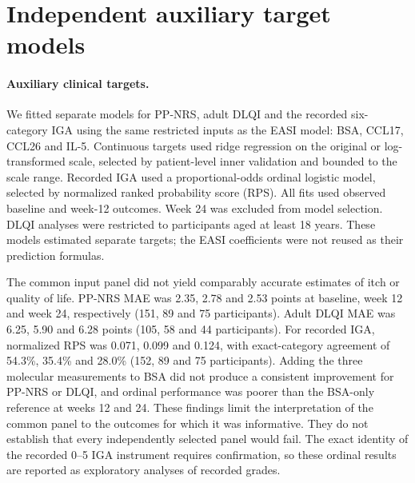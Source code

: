 \section*{Independent auxiliary target models}
\paragraph{Auxiliary clinical targets.}
We fitted separate models for PP-NRS, adult DLQI and the recorded six-category IGA using the same restricted inputs as the EASI model: BSA, CCL17, CCL26 and IL-5. Continuous targets used ridge regression on the original or log-transformed scale, selected by patient-level inner validation and bounded to the scale range. Recorded IGA used a proportional-odds ordinal logistic model, selected by normalized ranked probability score (RPS). All fits used observed baseline and week-12 outcomes. Week 24 was excluded from model selection. DLQI analyses were restricted to participants aged at least 18 years. These models estimated separate targets; the EASI coefficients were not reused as their prediction formulas.

The common input panel did not yield comparably accurate estimates of itch or quality of life. PP-NRS MAE was 2.35, 2.78 and 2.53 points at baseline, week 12 and week 24, respectively (151, 89 and 75 participants). Adult DLQI MAE was 6.25, 5.90 and 6.28 points (105, 58 and 44 participants). For recorded IGA, normalized RPS was 0.071, 0.099 and 0.124, with exact-category agreement of 54.3\%, 35.4\% and 28.0\% (152, 89 and 75 participants). Adding the three molecular measurements to BSA did not produce a consistent improvement for PP-NRS or DLQI, and ordinal performance was poorer than the BSA-only reference at weeks 12 and 24. These findings limit the interpretation of the common panel to the outcomes for which it was informative. They do not establish that every independently selected panel would fail. The exact identity of the recorded 0--5 IGA instrument requires confirmation, so these ordinal results are reported as exploratory analyses of recorded grades.
